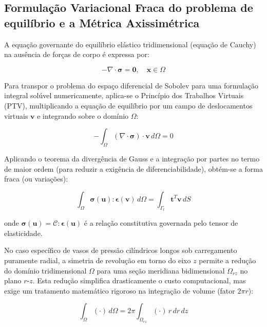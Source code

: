 \subsection{Formulação Variacional Fraca do problema de equilíbrio e a Métrica Axissimétrica}

A equação governante do equilíbrio elástico tridimensional (equação de Cauchy) na ausência de forças de corpo é expressa por:

\begin{equation}
  -\nabla \cdot \boldsymbol{\sigma} = \mathbf{0}, \quad \mathbf{x} \in \Omega
\end{equation}

Para transpor o problema do espaço diferencial de Sobolev para uma formulação integral solúvel numericamente, aplica-se o Princípio dos Trabalhos Virtuais (PTV), multiplicando a equação de equilíbrio por um campo de deslocamentos virtuais $\mathbf{v}$ e integrando sobre o domínio $\Omega$:

\begin{equation}
  -\int_\Omega (\nabla \cdot \boldsymbol{\sigma}) \cdot \mathbf{v} \, d\Omega = 0
\end{equation}

Aplicando o teorema da divergência de Gauss e a integração por partes no termo de maior ordem (para reduzir a exigência de diferenciabilidade), obtém-se a forma fraca (ou variações):

\begin{equation}
  \int_\Omega \boldsymbol{\sigma}(\mathbf{u}) : \boldsymbol{\epsilon}(\mathbf{v}) \, d\Omega = \int_{\Gamma_t} \mathbf{t}^T \mathbf{v} \, dS
\end{equation}

onde $\mathbf{\sigma}(\mathbf{u}) = \mathbf{\mathcal{C}} : \mathbf{\epsilon}(\mathbf{u})$ é a relação constitutiva governada pelo tensor de elasticidade.

No caso específico de vasos de pressão cilíndricos longos sob carregamento puramente radial, a simetria de revolução em torno do eixo $z$ permite a redução do domínio tridimensional $\Omega$ para uma seção meridiana bidimensional $\Omega_{rz}$ no plano $r$-$z$. Esta redução simplifica drasticamente o custo computacional, mas exige um tratamento matemático rigoroso na integração de volume (fator $2\pi r$):

\begin{equation}
  \int_\Omega (\cdot) \, d\Omega = 2\pi \int_{\Omega_{rz}} (\cdot) \, r \, dr \, dz
\end{equation}

